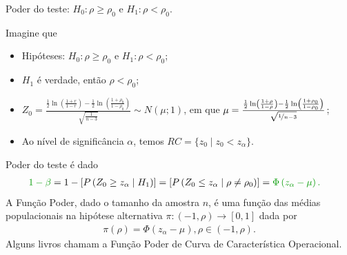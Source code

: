 \documentclass[9pt]{beamer}
\begin{document}
\begin{frame}{Poder do teste: $H_0:\rho \geq \rho_0$ e $H_1: \rho < \rho_0$.}

\normalsize

Imagine que
\begin{itemize}
	\item Hipóteses: $H_0:\rho \geq \rho_0$ e $H_1: \rho < \rho_0$;
	\item $H_1$ é verdade, então $\rho < \rho_0$;
	\item $Z_0 = \frac{\frac{1}{2} \ln\left( \frac{1 + r}{1 - r} \right) - \frac{1}{2} \ln\left( \frac{1 + \rho_0}{1 - \rho_0} \right)}{\sqrt{\frac{1}{n-3}}} \sim N\left( \mu; 1 \right)$, em que $\mu = \frac{ \frac{1}{2} \ln\left( \frac{1 + \rho}{1 - \rho} \right) -\frac{1}{2} \ln\left( \frac{1 + \rho_0}{1 - \rho_0} \right)  }{\sqrt{\nicefrac{1}{n-3}}}$;
	\item Ao nível de significância $\alpha$, temos $RC = \{ z_0 \mid z_0 < z_{\alpha}   \}$.
\end{itemize}
\vfill	

Poder do teste é dado
\begin{align*}
\textcolor{important}{1-\beta} &=1 - \left[P\left( Z_0 \geq z_{\alpha} \mid H_1 \right)\right] = \left[P\left(  Z_0 \leq z_{\alpha} \mid \rho \neq \rho_0 \right)\right]=\textcolor{important}{\Phi\left( z_{\alpha} - \mu \right).}
\end{align*}
A \textcolor{important}{Função Poder}, dado o tamanho da amostra $n$, é uma função das médias populacionais na hipótese alternativa  $\pi: (-1, \rho) \longrightarrow [0,1]$ dada por
\begin{align*}
\pi(\rho) = \Phi\left( z_{\alpha} - \mu \right), \rho \in (-1, \rho).
\end{align*}
Alguns livros chamam a Função Poder de \textcolor{important}{Curva de Característica Operacional.}

\normalsize

\end{frame}
\end{document}
